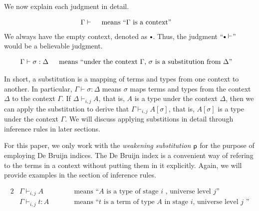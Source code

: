 We now explain each judgment in detail.

\begin{definition}
    \begin{alignat*}{2}
        &\Gamma \vdash \hspace{0.5em} && \text{means ``$\Gamma$ is a context''}
    \end{alignat*}
We always have the empty context, denoted as $\emptycon$. Thus, the judgment ``$\emptycon \vdash$'' would be a believable judgment.
\end{definition} 


\begin{definition}
    \begin{alignat*}{2}
        &\Gamma \vdash\sigma:\Delta \hspace{0.5em} && \text{means ``under the context $\Gamma$, $\sigma$ is a substitution from $\Delta$''}
    \end{alignat*}

In short, a substitution is a mapping of terms and types from one context to another. In particular, $\Gamma\vdash\sigma:\Delta$ means $\sigma$ maps terms and types from the context $\Delta$ to the context $\Gamma$. If $\Delta\vdash_{i,j}A$, that is, $A$ is a type under the context $\Delta$, then we can apply the substitution to derive that $\Gamma\vdash_{i,j}A[\sigma]$, that is, $A[\sigma]$ is a type under the context $\Gamma$. We will discuss applying substitions in detail through inference rules in later sections.

For this paper, we only work with the \emph{weakening substitution} $\mathsf{p}$ for the purpose of employing De Bruijn indices. The De Bruijn index is a convenient way of refering to the terms in a context without putting them in it explicitly. Again, we will provide examples in the section of inference rules.
\end{definition}


\begin{definition}
    \begin{alignat*}{2}
        & \Gamma \vdash_{i, j} A && \text{means ``$A$ is a type of stage $i$ , universe level $j$''} \\
        &\Gamma \vdash_{i, j} t:A \hspace{2em} && \text{means ``$t$ is a term of type  $A$ in stage $i$, universe level $j$ ''}
    \end{alignat*}
    
\end{definition}

